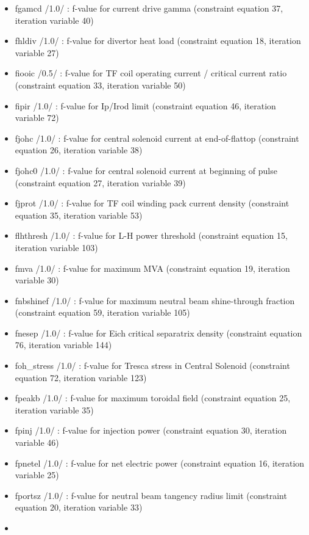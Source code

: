 \documentclass[]{article}
\begin{document}
\begin{itemize}
\begin{itemize}
  \item
    fgamcd /1.0/ : f-value for current drive gamma (constraint equation
    37, iteration variable 40)
  \item
    fhldiv /1.0/ : f-value for divertor heat load (constraint equation
    18, iteration variable 27)
  \item
    fiooic /0.5/ : f-value for TF coil operating current / critical
    current ratio (constraint equation 33, iteration variable 50)
  \item
    fipir /1.0/ : f-value for Ip/Irod limit (constraint equation 46,
    iteration variable 72)
  \item
    fjohc /1.0/ : f-value for central solenoid current at end-of-flattop
    (constraint equation 26, iteration variable 38)
  \item
    fjohc0 /1.0/ : f-value for central solenoid current at beginning of
    pulse (constraint equation 27, iteration variable 39)
  \item
    fjprot /1.0/ : f-value for TF coil winding pack current density
    (constraint equation 35, iteration variable 53)
  \item
    flhthresh /1.0/ : f-value for L-H power threshold (constraint
    equation 15, iteration variable 103)
  \item
    fmva /1.0/ : f-value for maximum MVA (constraint equation 19,
    iteration variable 30)
  \item
    fnbshinef /1.0/ : f-value for maximum neutral beam shine-through
    fraction (constraint equation 59, iteration variable 105)
  \item
    fnesep /1.0/ : f-value for Eich critical separatrix density
    (constraint equation 76, iteration variable 144)
  \item
    foh\_stress /1.0/ : f-value for Tresca stress in Central Solenoid
    (constraint equation 72, iteration variable 123)
  \item
    fpeakb /1.0/ : f-value for maximum toroidal field (constraint
    equation 25, iteration variable 35)
  \item
    fpinj /1.0/ : f-value for injection power (constraint equation 30,
    iteration variable 46)
  \item
    fpnetel /1.0/ : f-value for net electric power (constraint equation
    16, iteration variable 25)
  \item
    fportsz /1.0/ : f-value for neutral beam tangency radius limit
    (constraint equation 20, iteration variable 33)
  \item

\end{itemize}
\end{itemize}
\end{document}
